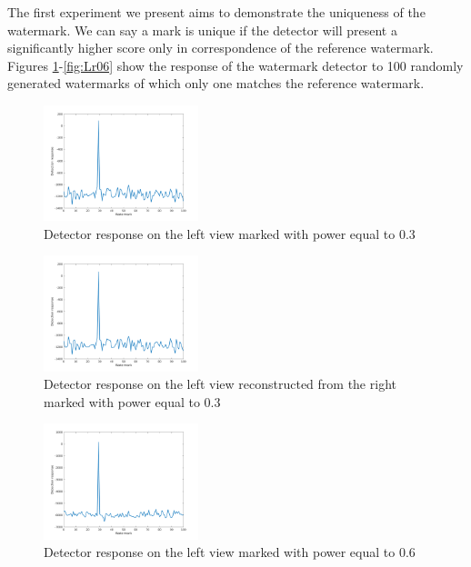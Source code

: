 The first experiment we present aims to demonstrate the uniqueness of the watermark. We can say a mark is unique if the detector will present a significantly higher score only in correspondence of the reference watermark. Figures \ref{fig:Ll03}-\ref{fig:Lr06} show the response of the watermark detector to 100 randomly generated watermarks of which only one matches the reference watermark. \newline 
\begin{figure}[h!]
\centering
\includegraphics[width=0.4\textwidth]{./img/likelihood/correct_LikelihoodL_03.png}
\caption{\small{Detector response on the left view marked with power equal to 0.3}}
\label{fig:Ll03}
\end{figure}
\begin{figure}[h!]
\centering
\includegraphics[width=0.4\textwidth]{./img/likelihood/correct_LikelihoodLr_03.png}
\caption{\small{Detector response on the left view reconstructed from the right marked with power equal to 0.3}}
\label{fig:Lr03}
\end{figure}
\begin{figure}[h!]
\centering
\includegraphics[width=0.4\textwidth]{./img/likelihood/correct_LikelihoodL_06.png}
\caption{\small{Detector response on the left view marked with power equal to 0.6}}
\label{fig:Ll06}
\end{figure}
